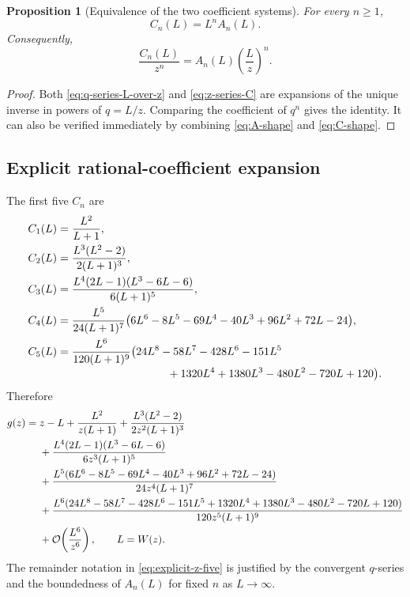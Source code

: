 \documentclass[11pt,a4paper]{article}
\numberwithin{equation}{section}
\newtheorem{proposition}[theorem]{Proposition}
\theoremstyle{definition}
\theoremstyle{remark}
\newcommand{\Ord}{\mathcal O}
\newcommand{\Acoef}{A}
\newcommand{\Ccoef}{C}
\begin{document}
\begin{proposition}[Equivalence of the two coefficient systems]
\label{prop:C-A-relation}
For every \(n\ge1\),
\begin{equation}\label{eq:C-A-relation}
  \Ccoef_n(L)=L^n\Acoef_n(L).
\end{equation}
Consequently,
\[
  \frac{\Ccoef_n(L)}{z^n}
  =\Acoef_n(L)\left(\frac{L}{z}\right)^n.
\]
\end{proposition}

\begin{proof}
Both \eqref{eq:q-series-L-over-z} and \eqref{eq:z-series-C} are expansions
of the unique inverse in powers of \(q=L/z\).  Comparing the coefficient
of \(q^n\) gives the identity.  It can also be verified immediately by
combining \eqref{eq:A-shape} and \eqref{eq:C-shape}.
\end{proof}

\subsection{Explicit rational-coefficient expansion}

The first five \(\Ccoef_n\) are
\begin{align}
 \Ccoef_1(L)&=\frac{L^2}{L+1},
 \label{eq:C1}\\
 \Ccoef_2(L)&=\frac{L^3(L^2-2)}{2(L+1)^3},
 \label{eq:C2}\\
 \Ccoef_3(L)&=\frac{L^4(2L-1)(L^3-6L-6)}{6(L+1)^5},
 \label{eq:C3}\\
 \Ccoef_4(L)&=\frac{L^5}{24(L+1)^7}
 \bigl(6L^6-8L^5-69L^4-40L^3
 +96L^2+72L-24\bigr),
 \label{eq:C4}\\
 \Ccoef_5(L)&=\frac{L^6}{120(L+1)^9}
 \bigl(24L^8-58L^7-428L^6-151L^5
 \notag\\[-0.2em]
 &\hspace{35mm}{}+1320L^4+1380L^3-480L^2-720L+120\bigr).
 \label{eq:C5}
\end{align}
Therefore
\begin{align}
 g(z)={}&z-L
 +\frac{L^2}{z(L+1)}
 +\frac{L^3(L^2-2)}{2z^2(L+1)^3}
 \notag\\
 &+\frac{L^4(2L-1)(L^3-6L-6)}{6z^3(L+1)^5}
 \notag\\
 &+\frac{L^5(6L^6-8L^5-69L^4-40L^3+96L^2+72L-24)}
 {24z^4(L+1)^7}
 \notag\\
 &+\frac{L^6(24L^8-58L^7-428L^6-151L^5+1320L^4+1380L^3
 -480L^2-720L+120)}
 {120z^5(L+1)^9}
 \notag\\
 &+\Ord\!\left(\frac{L^6}{z^6}\right),
 \qquad L=W(z).
 \label{eq:explicit-z-five}
\end{align}
The remainder notation in \eqref{eq:explicit-z-five} is justified by the
convergent \(q\)-series and the boundedness of \(\Acoef_n(L)\) for fixed
\(n\) as \(L\to\infty\).
\end{document}
